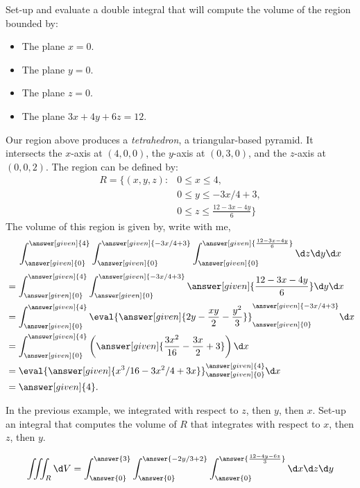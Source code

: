 \documentclass{ximera}
\begin{document}
\begin{example}
  Set-up and evaluate a double integral that will compute the volume of
  the region bounded by:
  \begin{itemize}
  \item The plane $x=0$.
  \item The plane $y=0$.
  \item The plane $z=0$.
  \item The plane $3x + 4y + 6z = 12$.
  \end{itemize}
  \begin{explanation}
    Our region above produces a
    \textit{tetrahedron}, a triangular-based
    pyramid. It intersects the $x$-axis at $(4,0,0)$, the $y$-axis at
    $(0,3,0)$, and the $z$-axis at $(0,0,2)$.  The region can be
    defined by:
    \begin{align*}
      R=\Big\{(x,y,z):&0\leq x\leq 4, \\
      &0\leq y\leq -3x/4+3, \\
      &0\leq z \leq \frac{12-3x-4y}{6}\Big\}
    \end{align*}
    The volume of this region is given by, write with me, 
    \[
    \int_{\answer[given]{0}}^{\answer[given]{4}} \int_{\answer[given]{0}}^{\answer[given]{-3x/4+3}} \int_{\answer[given]{0}}^{\answer[given]{\frac{12-3x-4y}{6}}}\d z \d y\d x 
    \]
    \begin{align*}
      &=\int_{\answer[given]{0}}^{\answer[given]{4}} \int_{\answer[given]{0}}^{\answer[given]{-3x/4+3}} \answer[given]{\frac{12-3x-4y}{6}} \d y \d x\\
      &= \int_{\answer[given]{0}}^{\answer[given]{4}}  \eval{\answer[given]{2y-\frac{xy}{2}-\frac{y^2}{3}}}_{\answer[given]{0}}^{\answer[given]{-3x/4+3}} \d x\\
      &= \int_{\answer[given]{0}}^{\answer[given]{4}}  \left(\answer[given]{\frac{3x^2}{16} -\frac{3x}{2}+3}\right) \d x\\
      &= \eval{\answer[given]{x^3/16-3x^2/4+3x}}_{\answer[given]{0}}^{\answer[given]{4}} \d x\\
      &=\answer[given]{4}.
    \end{align*}    
  \end{explanation}
\end{example}

\begin{question}
  In the previous example, we integrated with respect to $z$, then
  $y$, then $x$. Set-up an integral that computes the volume of $R$
  that integrates with respect to $x$, then $z$, then $y$.
  \begin{prompt}
    \[
    \iiint_R \d V = \int_{\answer{0}}^{\answer{3}}\int_{\answer{0}}^{\answer{-2y/3+2}} \int_{\answer{0}}^{\answer{\frac{12-4y-6z}{3}}} \d x \d z \d y
    \]
  \end{prompt}
\end{question}
\end{document}
